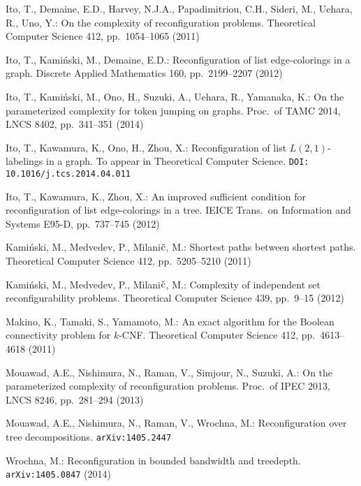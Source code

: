 \documentclass{llncs}
\begin{document}
\begin{thebibliography}{10}
Ito, T., Demaine, E.D., Harvey, N.J.A., Papadimitriou, C.H., Sideri, M., Uehara, R., Uno, Y.: 
On the complexity of reconfiguration problems.
Theoretical Computer Science 
412, pp.~1054--1065 (2011)

Ito, T., Kami\'nski, M., Demaine, E.D.: 
Reconfiguration of list edge-colorings in a graph. 
Discrete Applied Mathematics 160, pp.~2199--2207 (2012)

Ito, T., Kami\'nski, M., Ono, H., Suzuki, A., Uehara, R., Yamanaka, K.:
On the parameterized complexity for token jumping on graphs.
Proc.~of TAMC 2014, 
LNCS 8402, 
pp.~341--351 (2014)

Ito, T., Kawamura, K., Ono, H., Zhou, X.: 
Reconfiguration of list $L(2,1)$-labelings in a graph. 
To appear in 
Theoretical Computer Science. 
{\tt DOI: 10.1016/j.tcs.2014.04.011}

Ito, T., Kawamura, K., Zhou, X.: 
An improved sufficient condition for reconfiguration of list edge-colorings in a tree. 
IEICE Trans.~on Information and Systems E95-D, pp.~737--745 (2012) 

Kami\'nski, M., Medvedev, P., Milani${\rm \check{c}}$, M.: 
Shortest paths between shortest paths.
Theoretical Computer Science 
412, pp.~5205--5210 (2011)

Kami\'nski, M., Medvedev, P., Milani${\rm \check{c}}$, M.: 
Complexity of independent set reconfigurability problems.
Theoretical Computer Science 
439, pp.~9--15 (2012)

Makino, K., Tamaki, S., Yamamoto, M.:
An exact algorithm for the Boolean connectivity problem for $k$-CNF.
Theoretical Computer Science 
412, pp.~4613--4618 (2011)

Mouawad, A.E., Nishimura, N., Raman, V., Simjour, N., Suzuki, A.: 
On the parameterized complexity of reconfiguration problems.
Proc.~of IPEC 2013, 
LNCS 8246, 
pp.~281--294 (2013)

Mouawad, A.E., Nishimura, N., Raman, V., Wrochna, M.: 
Reconfiguration over tree decompositions.
{\tt arXiv:1405.2447}

Wrochna, M.:
Reconfiguration in bounded bandwidth and treedepth.
{\tt  arXiv:1405.0847} (2014)
\end{thebibliography}
\end{document}

